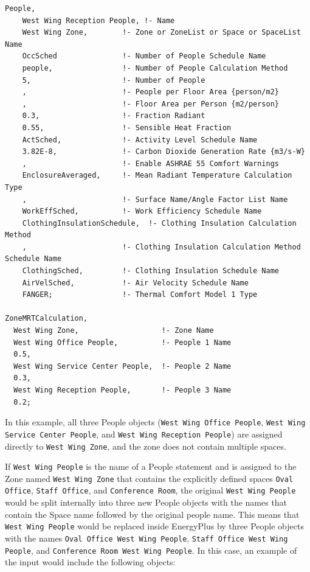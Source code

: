 \begin{lstlisting}
People,
    West Wing Reception People, !- Name
    West Wing Zone,        !- Zone or ZoneList or Space or SpaceList Name
    OccSched               !- Number of People Schedule Name
    people,                !- Number of People Calculation Method
    5,                     !- Number of People
    ,                      !- People per Floor Area {person/m2}
    ,                      !- Floor Area per Person {m2/person}
    0.3,                   !- Fraction Radiant
    0.55,                  !- Sensible Heat Fraction
    ActSched,              !- Activity Level Schedule Name
    3.82E-8,               !- Carbon Dioxide Generation Rate {m3/s-W}
    ,                      !- Enable ASHRAE 55 Comfort Warnings
    EnclosureAveraged,     !- Mean Radiant Temperature Calculation Type
    ,                      !- Surface Name/Angle Factor List Name
    WorkEffSched,          !- Work Efficiency Schedule Name
    ClothingInsulationSchedule,  !- Clothing Insulation Calculation Method
    ,                      !- Clothing Insulation Calculation Method Schedule Name
    ClothingSched,         !- Clothing Insulation Schedule Name
    AirVelSched,           !- Air Velocity Schedule Name
    FANGER;                !- Thermal Comfort Model 1 Type

ZoneMRTCalculation,
  West Wing Zone,                   !- Zone Name
  West Wing Office People,          !- People 1 Name
  0.5,
  West Wing Service Center People,  !- People 2 Name
  0.3,
  West Wing Reception People,       !- People 3 Name
  0.2;
\end{lstlisting}

In this example, all three People objects (\texttt{West Wing Office People}, \texttt{West Wing Service Center People}, and \texttt{West Wing Reception People}) are assigned directly to \texttt{West Wing Zone}, and the zone does not contain multiple spaces.

If \texttt{West Wing People} is the name of a People statement and is assigned to the Zone named \texttt{West Wing Zone} that contains the explicitly defined spaces \texttt{Oval Office}, \texttt{Staff Office}, and \texttt{Conference Room}, the original \texttt{West Wing People} would be split internally into three new People objects with the names that contain the Space name followed by the original people name.  This means that \texttt{West Wing People} would be replaced inside EnergyPlus by three People objects with the names \texttt{Oval Office West Wing People}, \texttt{Staff Office West Wing People}, and \texttt{Conference Room West Wing People}.  In this case, an example of the input would include the following objects:

